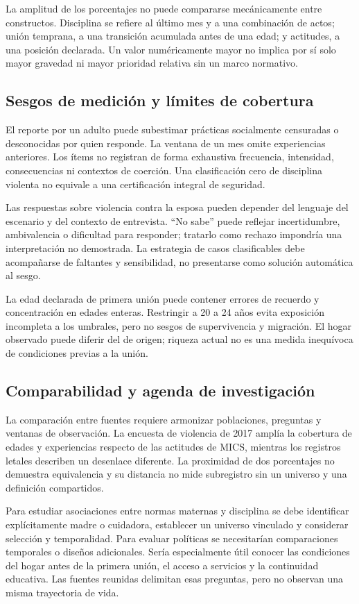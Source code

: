 \documentclass[11pt,a4paper]{article}
\begin{document}
La amplitud de los porcentajes no puede compararse mecánicamente entre
constructos. Disciplina se refiere al último mes y a una combinación de actos;
unión temprana, a una transición acumulada antes de una edad; y actitudes,
a una posición declarada. Un valor numéricamente mayor no implica por sí
solo mayor gravedad ni mayor prioridad relativa sin un marco normativo.

\subsection{Sesgos de medición y límites de cobertura}
El reporte por un adulto puede subestimar prácticas socialmente censuradas o
desconocidas por quien responde. La ventana de un mes omite experiencias
anteriores. Los ítems no registran de forma exhaustiva frecuencia, intensidad,
consecuencias ni contextos de coerción. Una clasificación cero de disciplina
violenta no equivale a una certificación integral de seguridad.

Las respuestas sobre violencia contra la esposa pueden depender del lenguaje
del escenario y del contexto de entrevista. ``No sabe'' puede reflejar
incertidumbre, ambivalencia o dificultad para responder; tratarlo como
rechazo impondría una interpretación no demostrada. La estrategia de casos
clasificables debe acompañarse de faltantes y sensibilidad, no presentarse
como solución automática al sesgo.

La edad declarada de primera unión puede contener errores de recuerdo y
concentración en edades enteras. Restringir a 20 a 24 años evita exposición
incompleta a los umbrales, pero no sesgos de supervivencia y migración.
El hogar observado puede diferir del de origen; riqueza actual no es una
medida inequívoca de condiciones previas a la unión.

\subsection{Comparabilidad y agenda de investigación}
La comparación entre fuentes requiere armonizar poblaciones, preguntas y
ventanas de observación. La encuesta de violencia de 2017 amplía la cobertura
de edades y experiencias respecto de las actitudes de MICS, mientras los
registros letales describen un desenlace diferente. La proximidad de dos
porcentajes no demuestra equivalencia y su distancia no mide subregistro
sin un universo y una definición compartidos.

Para estudiar asociaciones entre normas maternas y disciplina se debe
identificar explícitamente madre o cuidadora, establecer un universo vinculado
y considerar selección y temporalidad. Para evaluar políticas se necesitarían
comparaciones temporales o diseños adicionales. Sería especialmente útil
conocer las condiciones del hogar antes de la primera unión, el acceso a
servicios y la continuidad educativa. Las fuentes reunidas delimitan esas
preguntas, pero no observan una misma trayectoria de vida.
\end{document}
